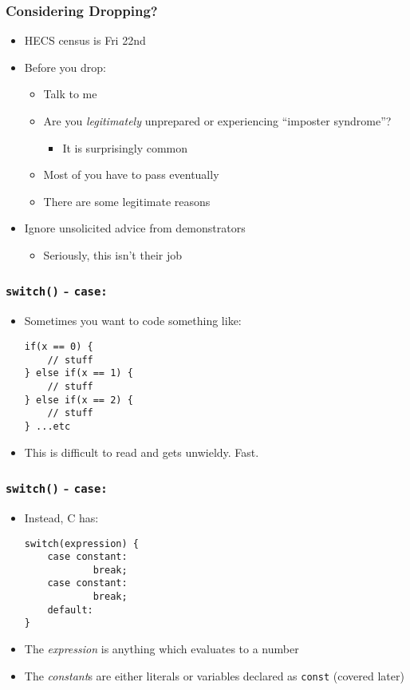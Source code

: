 \documentclass[14pt]{beamer}
\begin{document}
\begin{frame}
\frametitle{Considering Dropping?}
\begin{itemize}
\item HECS census is Fri 22nd
\item Before you drop:
	\begin{itemize}
		\item Talk to me
		\item Are you \textit{legitimately} unprepared or experiencing ``imposter syndrome''?
			\begin{itemize}
				\item It is surprisingly common
			\end{itemize}
		\item Most of you have to pass eventually
		\item There are some legitimate reasons
	\end{itemize}
\item Ignore unsolicited advice from demonstrators
	\begin{itemize}
		\item Seriously, this isn't their job
	\end{itemize}
\end{itemize}
\end{frame}

\begin{frame}[fragile]
\frametitle{\texttt{switch()} - \texttt{case:}}
\begin{itemize}
\item Sometimes you want to code something like:
\begin{lstlisting}[style=CStyle]
if(x == 0) {
	// stuff
} else if(x == 1) {
	// stuff
} else if(x == 2) {
	// stuff
} ...etc
\end{lstlisting}
\item This is difficult to read and gets unwieldy. Fast.
\end{itemize}
\end{frame}

\begin{frame}[fragile]
\frametitle{\texttt{switch()} - \texttt{case:}}
\begin{itemize}
\item Instead, C has:
\begin{lstlisting}[style=CStyle]
switch(expression) {
	case constant:
			break;
	case constant:
			break;
	default:
}
\end{lstlisting}
\item The \textit{expression} is anything which evaluates to a number
\item The \textit{constant}s are either literals or variables declared as \texttt{const} (covered later)
\end{itemize}
\end{frame}
\end{document}
